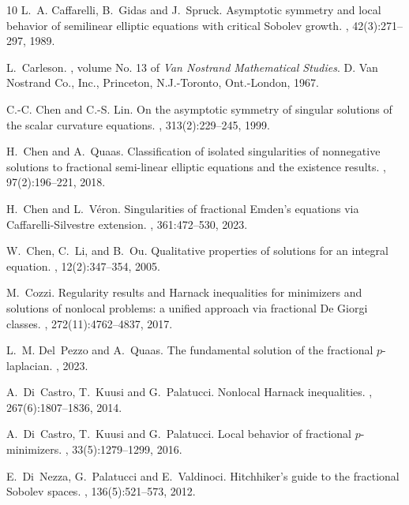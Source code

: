 \documentclass[11pt]{amsart}
\theoremstyle{plain}
\theoremstyle{definition}
\numberwithin{equation}{section}
\begin{document}
\begin{thebibliography}{10}
L.~A. Caffarelli, B.~Gidas and J.~Spruck.
\newblock Asymptotic symmetry and local behavior of semilinear elliptic
  equations with critical {S}obolev growth.
, 42(3):271--297, 1989.

L.~Carleson.
, volume No. 13 of {\em
  Van Nostrand Mathematical Studies}.
\newblock D. Van Nostrand Co., Inc., Princeton, N.J.-Toronto, Ont.-London,
  1967.

C.-C. Chen and C.-S. Lin.
\newblock On the asymptotic symmetry of singular solutions of the scalar
  curvature equations.
, 313(2):229--245, 1999.

H.~Chen and A.~Quaas.
\newblock Classification of isolated singularities of nonnegative solutions to
  fractional semi-linear elliptic equations and the existence results.
, 97(2):196--221, 2018.

H.~Chen and L.~V\'eron.
\newblock Singularities of fractional {E}mden's equations via
  {C}affarelli-{S}ilvestre extension.
, 361:472--530, 2023.

W.~Chen, C.~Li, and B.~Ou.
\newblock Qualitative properties of solutions for an integral equation.
, 12(2):347--354, 2005.

M.~Cozzi.
\newblock Regularity results and {H}arnack inequalities for minimizers and
  solutions of nonlocal problems: a unified approach via fractional {D}e
  {G}iorgi classes.
, 272(11):4762--4837, 2017.

L.~M. Del~Pezzo and A.~Quaas.
\newblock The fundamental solution of the fractional $p$-laplacian.
, 2023.

A.~Di~Castro, T.~Kuusi and G.~Palatucci.
\newblock Nonlocal {H}arnack inequalities.
, 267(6):1807--1836, 2014.

A.~Di~Castro, T.~Kuusi and G.~Palatucci.
\newblock Local behavior of fractional {$p$}-minimizers.
,
  33(5):1279--1299, 2016.

E.~Di~Nezza, G.~Palatucci and E.~Valdinoci.
\newblock Hitchhiker's guide to the fractional {S}obolev spaces.
, 136(5):521--573, 2012.


\end{thebibliography}
\end{document}
